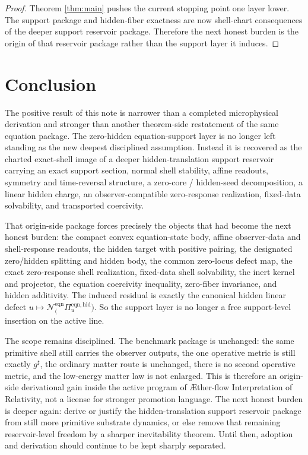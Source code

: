 \documentclass[11pt]{article}
\newcommand{\Aflow}{\AE{}ther-flow}
\newcommand{\TheoryName}{\Aflow{} Interpretation of Relativity}
\newcommand{\CompletedMetric}{g^{\sharp}}
\newcommand{\EqnProj}[1]{\Pi_{#1}^{\mathrm{eqn,hid}}}
\newcommand{\EqnLin}[1]{\mathcal N_{#1}^{\mathrm{eqn}}}
\begin{document}
\begin{proof}
Theorem \ref{thm:main} pushes the current stopping point one layer lower. The support package and hidden-fiber exactness are now shell-chart consequences of the deeper support reservoir package. Therefore the next honest burden is the origin of that reservoir package rather than the support layer it induces.
\end{proof}

\section{Conclusion}

The positive result of this note is narrower than a completed microphysical derivation and stronger than another theorem-side restatement of the same equation package. The zero-hidden equation-support layer is no longer left standing as the new deepest disciplined assumption. Instead it is recovered as the charted exact-shell image of a deeper hidden-translation support reservoir carrying an exact support section, normal shell stability, affine readouts, symmetry and time-reversal structure, a zero-core / hidden-seed decomposition, a linear hidden charge, an observer-compatible zero-response realization, fixed-data solvability, and transported coercivity.

That origin-side package forces precisely the objects that had become the next honest burden: the compact convex equation-state body, affine observer-data and shell-response readouts, the hidden target with positive pairing, the designated zero/hidden splitting and hidden body, the common zero-locus defect map, the exact zero-response shell realization, fixed-data shell solvability, the inert kernel and projector, the equation coercivity inequality, zero-fiber invariance, and hidden additivity. The induced residual is exactly the canonical hidden linear defect \(u\mapsto \EqnLin(\EqnProj u)\). So the support layer is no longer a free support-level insertion on the active line.

The scope remains disciplined. The benchmark package is unchanged: the same primitive shell still carries the observer outputs, the one operative metric is still exactly \(\CompletedMetric\), the ordinary matter route is unchanged, there is no second operative metric, and the low-energy matter law is not enlarged. This is therefore an origin-side derivational gain inside the active program of \TheoryName{}, not a license for stronger promotion language. The next honest burden is deeper again: derive or justify the hidden-translation support reservoir package from still more primitive substrate dynamics, or else remove that remaining reservoir-level freedom by a sharper inevitability theorem. Until then, adoption and derivation should continue to be kept sharply separated.
\end{document}
